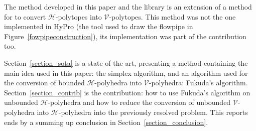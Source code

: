 The method developed in this paper and the library is an extension of a method for to convert $\mathcal{H}$-polytopes into $\mathcal{V}$-polytopes. This method was not the one implemented in HyPro (the tool used to draw the flowpipe in Figure~\ref{fowpipeconstruction}), its implementation was part of the contribution too.

Section~\ref{section_sota} is a state of the art, presenting a method containing the main idea used in this paper: the simplex algorithm, and an algorithm used for the conversion of bounded $\mathcal{H}$-polyhedra into $\mathcal{V}$-polyhedra: Fukuda's algorithm. Section~\ref{section_contrib} is the contribution: how to use Fukuda's algorithm on unbounded $\mathcal{H}$-polyhedra and how to reduce the conversion of unbounded $\mathcal{V}$-polyhedra into $\mathcal{H}$-polyhedra into the previously resolved problem. This reports ends by a summing up conclusion in Section~\ref{section_conclusion}. 



